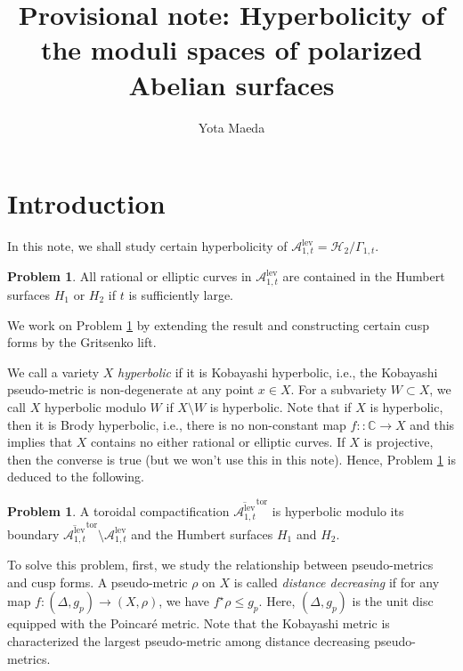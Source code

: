 \documentclass[12pt, pdftex]{amsart}
\theoremstyle{plain}
\theoremstyle{definition}
\newtheorem{prob}[thm]{Problem}
\numberwithin{equation}{section}
\def\A{{\mathbb A}}
\def\C{{\mathbb C}}
\def\tor{\mathrm{tor}}
\def\lev{\mathrm{lev}}
\def\H{\mathscr{H}}
\def\A{\mathcal{A}}
\begin{document}
\title[Hyperbolicity of the moduli spaces of polarized Abelian surfaces]
{Provisional note: Hyperbolicity of the moduli spaces of polarized Abelian surfaces}
\author{Yota Maeda}
\maketitle

\section{Introduction}
In this note, we shall study certain hyperbolicity of $\A^{\lev}_{1,t}=\H_2/\Gamma_{1,t}$.
\begin{prob}
\label{prob:main}
All rational or elliptic curves in $\A^{\lev}_{1,t}$ are contained in the Humbert surfaces $H_1$ or $H_2$ if $t$ is sufficiently large.
\end{prob}
We work on Problem \ref{prob:main} by extending the result \cite{Rou13} and constructing certain cusp forms by the Gritsenko lift.

We call a variety $X$ \textit{hyperbolic} if it is Kobayashi hyperbolic, i.e., the Kobayashi pseudo-metric is non-degenerate at any point $x\in X$.
For a subvariety $W\subset X$, we call $X$ hyperbolic modulo $W$ if $X\setminus W$ is hyperbolic.
Note that if $X$ is hyperbolic, then it is Brody hyperbolic, i.e., there is no non-constant map $f\colon:\C\to X$ and this implies that $X$ contains no  either rational or elliptic curves.
If $X$ is projective, then the converse is true (but we won't use this in this note).
Hence, Problem \ref{prob:main} is deduced to the following.
\begin{prob}
\label{prob:hyperbolicity}
A toroidal compactification $\overline{\A^{\lev}_{1,t}}^{\tor}$ is hyperbolic modulo its boundary $\overline{\A^{\lev}_{1,t}}^{\tor}\setminus \A^{\lev}_{1,t}$ and the Humbert surfaces $H_1$ and $H_2$.
\end{prob}
To solve this problem, first, we study the relationship between pseudo-metrics and cusp forms.
A pseudo-metric $\rho$ on $X$ is called \textit{distance decreasing} if for any map $f\colon (\Delta, g_p) \to (X, \rho)$, we have $f^{\star}\rho \leq g_p$.
Here, $(\Delta, g_p)$ is the unit disc equipped with the Poincar\'{e} metric.
Note that the Kobayashi metric is characterized the largest pseudo-metric among distance decreasing pseudo-metrics.
\end{document}
